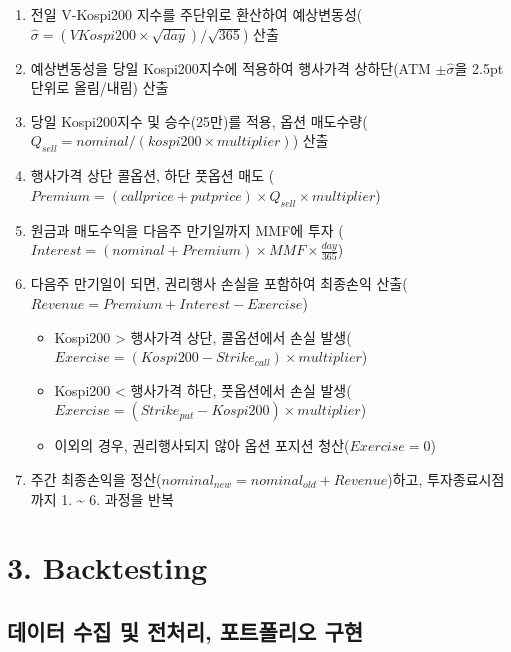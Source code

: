 \documentclass[
  a4paper,
  DIV=11,
  numbers=noendperiod]{scrreprt}
\providecommand{\tightlist}{%
  \setlength{\itemsep}{0pt}\setlength{\parskip}{0pt}}\usepackage{longtable,booktabs,array}
\begin{document}
\begin{enumerate}
\def\labelenumi{\arabic{enumi}.}
\tightlist
\item
  전일 V-Kospi200 지수를 주단위로 환산하여
  예상변동성(\(\hat\sigma=(VKospi200\times \sqrt{day})/\sqrt{365}\))
  산출
\item
  예상변동성을 당일 Kospi200지수에 적용하여 행사가격 상하단(ATM
  \(\pm\hat\sigma\)을 2.5pt 단위로 올림/내림) 산출
\item
  당일 Kospi200지수 및 승수(25만)를 적용, 옵션
  매도수량(\(Q_{sell}=nominal/(kospi200\times multiplier)\)) 산출
\item
  행사가격 상단 콜옵션, 하단 풋옵션 매도
  (\(Premium=(call price+put price)\times Q_{sell}\times multiplier\))
\item
  원금과 매도수익을 다음주 만기일까지 MMF에 투자
  (\(Interest=(nominal+Premium)\times MMF \times \frac{day}{365}\))
\item
  다음주 만기일이 되면, 권리행사 손실을 포함하여 최종손익
  산출(\(Revenue=Premium+Interest-Exercise\))

  \begin{itemize}
  \tightlist
  \item
    Kospi200 \textgreater{} 행사가격 상단, 콜옵션에서 손실
    발생(\(Exercise=(Kospi200-Strike_{call})\times multiplier\))
  \item
    Kospi200 \textless{} 행사가격 하단, 풋옵션에서 손실
    발생(\(Exercise=(Strike_{put}-Kospi200)\times multiplier\))
  \item
    이외의 경우, 권리행사되지 않아 옵션 포지션 청산(\(Exercise=0\))
  \end{itemize}
\item
  주간 최종손익을 정산(\(nominal_{new}=nominal_{old}+Revenue\))하고,
  투자종료시점까지 1. \textasciitilde{} 6. 과정을 반복
\end{enumerate}

\section*{3. Backtesting}\label{backtesting}


\subsection*{데이터 수집 및 전처리, 포트폴리오
구현}\label{uxb370uxc774uxd130-uxc218uxc9d1-uxbc0f-uxc804uxcc98uxb9ac-uxd3ecuxd2b8uxd3f4uxb9acuxc624-uxad6cuxd604}
\end{document}
